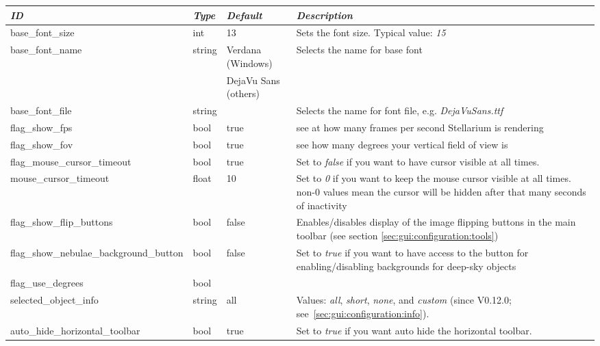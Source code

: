 \begin{longtabu} to \textwidth {l|l|l|X}
\toprule
\emph{ID} & \emph{Type} & \emph{Default} & \emph{Description}\\\midrule
base\_font\_size & int    & 13 & Sets the font size. Typical value: \emph{15}\\\midrule
base\_font\_name & string & Verdana (Windows)    & Selects the name for base font\\
                 &        & DejaVu Sans (others) & \\\midrule
base\_font\_file & string & & Selects the name for font file, e.g. \emph{DejaVuSans.ttf}\\\midrule
flag\_show\_fps                 & bool   & true & see at how many frames per second Stellarium is rendering\\\midrule
flag\_show\_fov                 & bool   & true & see how many degrees your vertical field of view is\\\midrule
flag\_mouse\_cursor\_timeout    & bool  & true  & Set to \emph{false} if you want to have cursor visible at all times.\\\midrule
mouse\_cursor\_timeout          & float & 10    & Set to \emph{0} if you want to keep the mouse cursor visible at all times. 
                                                  non-0 values mean the cursor will be hidden after that many seconds of inactivity\\\midrule
flag\_show\_flip\_buttons       & bool  & false & Enables/disables display of the image flipping buttons in the main 
                                                  toolbar (see section \ref{sec:gui:configuration:tools})\\\midrule
flag\_show\_nebulae\_background\_button & bool & false & Set to \emph{true} if you want to have access to the 
                                                         button for enabling/disabling backgrounds for deep-sky objects\\\midrule
flag\_use\_degrees              & bool   &&\\\midrule
selected\_object\_info          & string & all  & Values: \emph{all}, \emph{short}, \emph{none}, 
                                                  and \emph{custom} (since V0.12.0; see~\ref{sec:gui:configuration:info}).\\\midrule
auto\_hide\_horizontal\_toolbar & bool   & true & Set to \emph{true} if you want auto hide the horizontal toolbar.\\\midrule

\end{longtabu}
